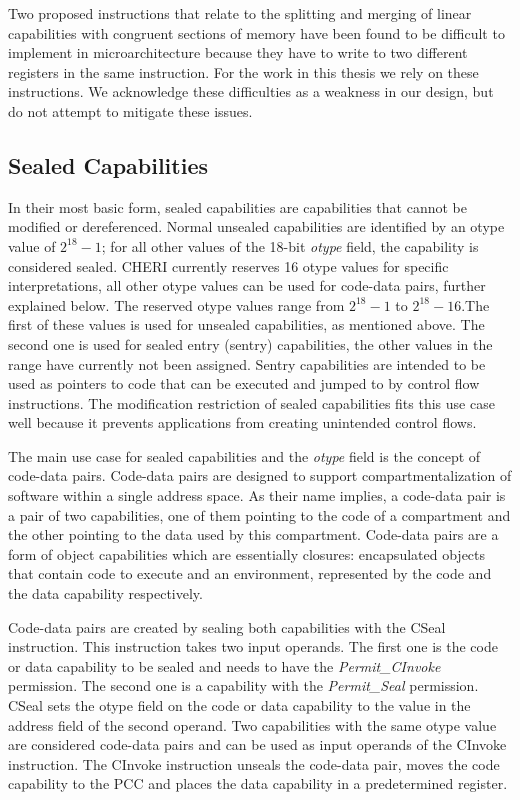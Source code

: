 Two proposed instructions that relate to the splitting and merging of linear capabilities with congruent sections of memory have been found to be difficult to implement in microarchitecture because they have to write to two different registers in the same instruction. For the work in this thesis we rely on these instructions. We acknowledge these difficulties as a weakness in our design, but do not attempt to mitigate these issues.

\subsection{Sealed Capabilities}
\label{sec:sealed}
In their most basic form, sealed capabilities are capabilities that cannot be modified or dereferenced. Normal unsealed capabilities are identified by an otype value of $2^{18} - 1$; for all other values of the 18-bit \textit{otype} field, the capability is considered sealed. CHERI currently reserves 16 otype values for specific interpretations, all other otype values can be used for code-data pairs, further explained below. The reserved otype values range from $2^{18} - 1$ to $2^{18} - 16$.The first of these values is used for unsealed capabilities, as mentioned above. The second one is used for sealed entry (sentry) capabilities, the other values in the range have currently not been assigned. Sentry capabilities are intended to be used as pointers to code that can be executed and jumped to by control flow instructions. The modification restriction of sealed capabilities fits this use case well because it prevents applications from creating unintended control flows.

The main use case for sealed capabilities and the \textit{otype} field is the concept of code-data pairs. Code-data pairs are designed to support compartmentalization of software within a single address space. As their name implies, a code-data pair is a pair of two capabilities, one of them pointing to the code of a compartment and the other pointing to the data used by this compartment. Code-data pairs are a form of object capabilities which are essentially closures: encapsulated objects that contain code to execute and an environment, represented by the code and the data capability respectively.

Code-data pairs are created by sealing both capabilities with the CSeal instruction. This instruction takes two input operands. The first one is the code or data capability to be sealed and needs to have the \textit{Permit\_CInvoke} permission. The second one is a capability with the \textit{Permit\_Seal} permission. CSeal sets the otype field on the code or data capability to the value in the address field of the second operand. Two capabilities with the same otype value are considered code-data pairs and can be used as input operands of the CInvoke instruction. The CInvoke instruction unseals the code-data pair, moves the code capability to the PCC and places the data capability in a predetermined register.

